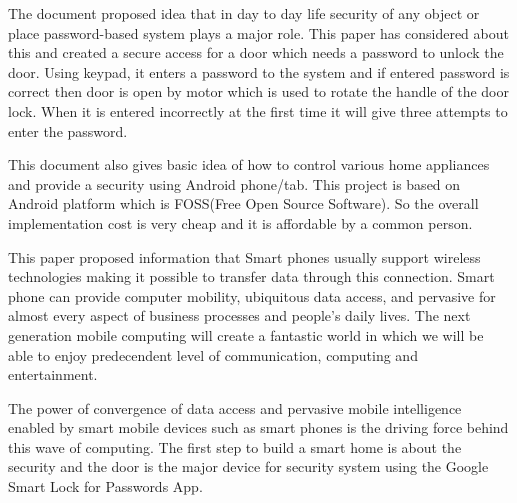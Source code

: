 \documentclass[options]{article}
\begin{document}
\cite{lee:pak}The document proposed idea that in day to day life security of any object or place password-based system plays a major role.
This paper has considered about this and created a secure access for a door which needs a password to unlock the door. Using
keypad, it enters a password to the system and if entered password is correct then door is open by motor which is used to
rotate the handle of the door lock. When it is entered incorrectly at the first time it will give three attempts to enter the 
password.

\cite{key:mut}This document also gives basic idea of how to control various home appliances and provide a security using Android 
phone/tab. This project is based on Android platform which is FOSS(Free Open Source Software). So the overall implementation
cost is very cheap and it is affordable by a common person.

\cite{lee:kal}This paper proposed information that Smart phones usually support wireless technologies making it possible to 
transfer data through this connection. Smart phone can provide computer mobility, ubiquitous data access, and pervasive 
for almost every aspect of business processes and people’s daily lives. The next generation mobile computing will
 create a fantastic world in which we will be able to enjoy predecendent level of communication, computing and
  entertainment. 

The power of convergence of data access and pervasive mobile intelligence enabled by smart mobile devices such
as smart phones is the driving force behind this wave of computing. The first step to build a smart home is about 
the security and the door is the major device for security system using the Google Smart Lock for Passwords App.
\end{document}
